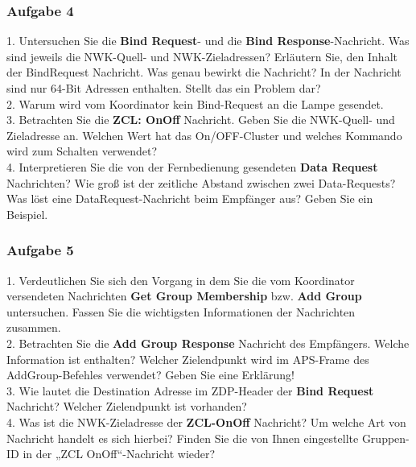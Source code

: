        \subsubsection{Aufgabe 4}
        \begin{Fragen}
            1. Untersuchen Sie die \textbf{Bind Request}- und die \textbf{Bind Response}-Nachricht. 
            Was sind jeweils die NWK-Quell- und NWK-Zieladressen? Erläutern Sie, den Inhalt der BindRequest Nachricht. 
            Was genau bewirkt die Nachricht? In der Nachricht sind nur 64-Bit Adressen enthalten. Stellt das ein Problem dar? \\
            
            2. Warum wird vom Koordinator kein Bind-Request an die Lampe gesendet. \\
            
            3. Betrachten Sie die \textbf{ZCL: OnOff} Nachricht. Geben Sie die NWK-Quell- und Zieladresse an. 
            Welchen Wert hat das On/OFF-Cluster und welches Kommando wird zum Schalten verwendet?\\
            
            4. Interpretieren Sie die von der Fernbedienung gesendeten \textbf{Data Request} Nachrichten?
            Wie groß ist der zeitliche Abstand zwischen zwei Data-Requests? Was löst eine DataRequest-Nachricht beim Empfänger aus? Geben Sie ein Beispiel. 
            \end{Fragen}

            \subsubsection{Aufgabe 5}

            \begin{Fragen}
                1. Verdeutlichen Sie sich den Vorgang in dem Sie die vom Koordinator versendeten
                Nachrichten \textbf{Get Group Membership} bzw. \textbf{Add Group} untersuchen. Fassen Sie die
                wichtigsten Informationen der Nachrichten zusammen. \\
                
                2. Betrachten Sie die \textbf{Add Group Response} Nachricht des Empfängers.
                Welche Information ist enthalten? Welcher Zielendpunkt wird im APS-Frame des AddGroup-Befehles verwendet? Geben
                Sie eine Erklärung! \\
                
                3. Wie lautet die Destination Adresse im ZDP-Header der \textbf{Bind Request} Nachricht?
                Welcher Zielendpunkt ist vorhanden? \\
                
                4. Was ist die NWK-Zieladresse der \textbf{ZCL-OnOff} Nachricht? Um welche Art von Nachricht handelt es sich hierbei?
                Finden Sie die von Ihnen eingestellte Gruppen-ID in der „ZCL OnOff“-Nachricht wieder? \\
                \end{Fragen}
                
